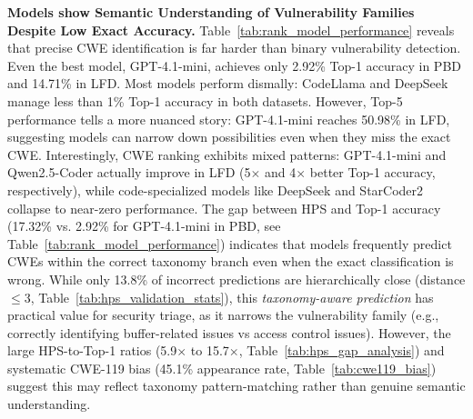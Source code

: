 \documentclass[lettersize,journal]{IEEEtran}
\begin{document}
\textbf{Models show Semantic Understanding of Vulnerability Families Despite Low Exact Accuracy.} Table~\ref{tab:rank_model_performance} reveals that precise \gls{CWE} identification is far harder than binary vulnerability detection. Even the best model, GPT-4.1-mini, achieves only 2.92\% Top-1 accuracy in PBD and 14.71\% in LFD. Most models perform dismally: CodeLlama and DeepSeek manage less than 1\% Top-1 accuracy in both datasets. However, Top-5 performance tells a more nuanced story: GPT-4.1-mini reaches 50.98\% in LFD, suggesting models can narrow down possibilities even when they miss the exact CWE. Interestingly, \gls{CWE} ranking exhibits mixed patterns: GPT-4.1-mini and Qwen2.5-Coder actually improve in LFD (5$\times$ and 4$\times$ better Top-1 accuracy, respectively), while code-specialized models like DeepSeek and StarCoder2 collapse to near-zero performance. The gap between \gls{HPS} and Top-1 accuracy (17.32\% vs. 2.92\% for GPT-4.1-mini in PBD, see Table~\ref{tab:rank_model_performance}) indicates that models frequently predict CWEs within the correct taxonomy branch even when the exact classification is wrong.
While only 13.8\% of incorrect predictions are hierarchically close (distance $\leq$3, Table~\ref{tab:hps_validation_stats}), this \textit{taxonomy-aware prediction} has practical value for security triage, as it narrows the vulnerability family (e.g., correctly identifying buffer-related issues vs access control issues).
However, the large HPS-to-Top-1 ratios (5.9$\times$ to 15.7$\times$, Table~\ref{tab:hps_gap_analysis}) and systematic CWE-119 bias (45.1\% appearance rate, Table~\ref{tab:cwe119_bias}) suggest this may reflect taxonomy pattern-matching rather than genuine semantic understanding.
\end{document}
